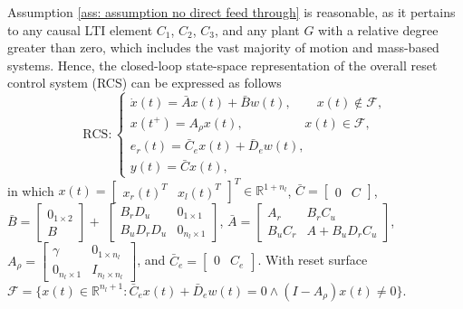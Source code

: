 Assumption \ref{ass: assumption no direct feed through} is reasonable, as it pertains to any causal LTI element $C_1$, $C_2$, $C_3$, and any plant \( G \) with a relative degree greater than zero, which includes the vast majority of motion and mass-based systems. Hence, the closed-loop state-space representation of the overall reset control system (RCS) can be expressed as follows
\begin{equation} 
		\text{RCS} : \begin{cases}
			\label{eq.SS closed loop}
            \dot{x}(t)=\bar{A}x(t)+\bar{B}w(t), \qquad   x(t)\notin \mathcal{F},\\
            x(t^+)=A_\rho x(t), \: \: \: \, \qquad   \qquad x(t)\in \mathcal{F},\\
            e_r(t)=\bar{C}_ex(t)+\bar{D}_e w(t), \\
            y(t)=\bar{C}x(t),
		\end{cases}
	\end{equation}
in which $x(t)=\begin{bmatrix}
    x_r(t)^T & x_l(t)^T
\end{bmatrix}^T \in\mathbb{R}^{1+n_l}$, $\bar{C}=\begin{bmatrix}
    0 & C
\end{bmatrix}$, $\bar{B}=\begin{bmatrix}  0_{1\times 2}\\ B \end{bmatrix} +$ $\begin{bmatrix}  B_rD_u & 0_{1\times 1}\\ B_uD_rD_u & 0_{n_l\times 1} \end{bmatrix}$, $\bar{A}=\begin{bmatrix}
    A_r & B_rC_u\\
    B_uC_r & A+B_uD_rC_u
\end{bmatrix}$, $A_\rho = \begin{bmatrix}
    \gamma & 0_{1\times n_l}\\
    
    0_{n_l\times 1} & I_{n_l\times n_l}
\end{bmatrix}$, and $\bar{C}_e=\begin{bmatrix}
    0 & C_e
\end{bmatrix}$. With reset surface $\mathcal{F}=\{x(t) \in \mathbb{R}^{n_l+1}:\bar{C}_ex(t)+\bar{D}_e w(t)=0 \wedge (I-A_\rho)x(t)\neq0\}$.

